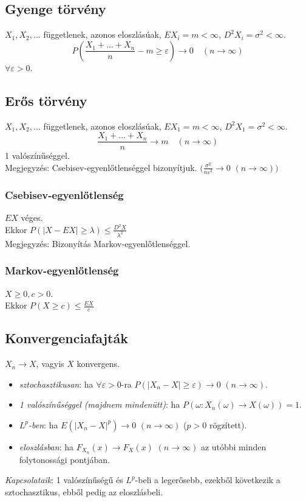 \documentclass[tikz,12pt,margin=0px]{article}
\newcommand\ddfrac[2]{\frac{\displaystyle #1}{\displaystyle #2}}
\begin{document}
	\subsection*{Gyenge törvény}
	
	$X_1, X_2, ...$ függetlenek, azonos eloszlásúak, $EX_i = m < \infty$, $D^{2}X_i = \sigma^2 < \infty$. \\
	\[
        P\left(\ddfrac{X_1 + ... + X_n}{n} - m \geq \varepsilon\right) \rightarrow 0 \quad (n \to \infty)
    \]
    $\forall \varepsilon > 0$.

	\subsection*{Erős törvény}
	
	$X_1, X_2, ...$ függetlenek, azonos eloszlásúak, $EX_1 = m < \infty$, $D^{2}X_1 = \sigma^2 < \infty$. \\
	\[
        \ddfrac{X_1 + ... + X_n}{n} \rightarrow m \quad (n \to \infty)
    \]
    1 valószínűséggel. \\
	Megjegyzés: Csebisev-egyenlőtlenséggel bizonyítjuk. $\Big(\ddfrac{\sigma^2}{n \varepsilon^2} \to 0$ $(n \to \infty)\Big)$
	
	\subsubsection*{Csebisev-egyenlőtlenség}
	
	$EX$ véges. \\
	Ekkor $P(|X-EX| \geq \lambda) \leq \ddfrac{D^{2}X}{\lambda^2}$ \\
	Megjegyzés: Bizonyítás Markov-egyenlőtlenséggel.
	
	\subsubsection*{Markov-egyenlőtlenség}
	
	$X \geq 0, c > 0$. \\
	Ekkor $P(X \geq c) \leq \ddfrac{EX}{c}$
	
	\subsection*{Konvergenciafajták}
	
	$X_n \to X$, vagyis $X$ konvergens.
	\begin{itemize}
		\item \textit{sztochasztikusan}: ha $\forall \varepsilon > 0$-ra $P(|X_n - X| \geq \varepsilon) \rightarrow 0$ $(n \to \infty)$.
		\item \textit{1 valószínűséggel (majdnem mindenütt)}: ha $P(\omega : X_n(\omega) \to X(\omega)) = 1$.
		\item \textit{$L^p$-ben}: ha $E(|X_n - X|^p) \rightarrow 0$ $(n \to \infty)$ ($p>0$ rögzített).
		\item \textit{eloszlásban}: ha $F_{X_n}(x) \rightarrow F_{X}(x)$ $(n \to \infty)$ az utóbbi minden folytonossági pontjában.
	\end{itemize}
	\textit{Kapcsolataik}: 1 valószínűségű és $L^p$-beli a legerősebb, ezekből következik a sztochasztikus, ebből pedig az eloszlásbeli.
	
\end{document}
